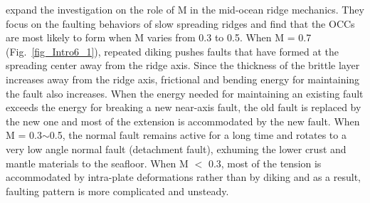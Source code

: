 \citet{Tucholke2008} expand the investigation on the role of M in the mid-ocean ridge mechanics. They focus on the faulting behaviors of slow spreading ridges and find that the OCCs are most likely to form when M varies from 0.3 to 0.5. When M = 0.7 (Fig.~\ref{fig_Intro6_1}), repeated diking pushes faults that have formed at the spreading center away from the ridge axis. Since the thickness of the brittle layer increases away from the ridge axis, frictional and bending energy for maintaining the fault also increases. When the energy needed for maintaining an existing fault exceeds the energy for breaking a new near-axis fault, the old fault is replaced by the new one and most of the extension is accommodated by the new fault. When M = 0.3$\sim$0.5, the normal fault remains active for a long time and rotates to a very low angle normal fault (detachment fault), exhuming the lower crust and mantle materials to the seafloor. When M $<$ 0.3, most of the tension is accommodated by intra-plate deformations rather than by diking and as a result, faulting pattern is more complicated and unsteady.

